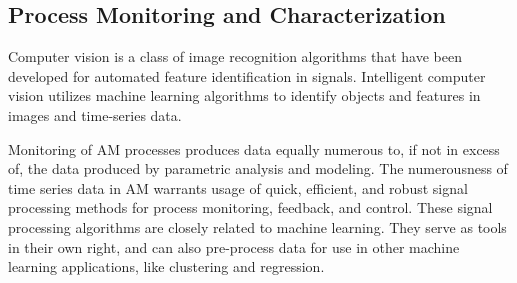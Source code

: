 \subsection{Process Monitoring and Characterization}
Computer vision is a class of image recognition algorithms that have been developed for automated feature identification in signals. Intelligent computer vision utilizes machine learning algorithms to identify objects and features in images and time-series data. 

Monitoring of AM processes produces data equally numerous to, if not in excess of, the data produced by parametric analysis and modeling. The numerousness of time series data in AM warrants usage of quick, efficient, and robust signal processing methods for process monitoring, feedback, and control. These signal processing algorithms are closely related to machine learning. They serve as tools in their own right, and can also pre-process data for use in other machine learning applications, like clustering and regression. 




 


